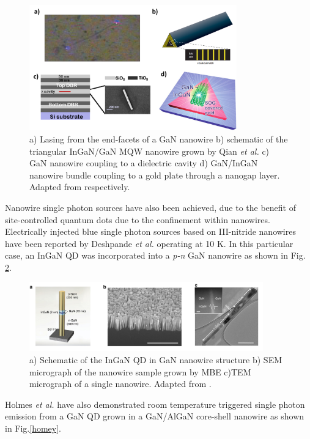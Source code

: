 \begin{figure}[h]
	\centering
	\includegraphics[width=0.8\textwidth]{Figs/Ch1/nw_lasers.png}
	\caption {a) Lasing from the end-facets of a GaN nanowire b) schematic of the triangular InGaN/GaN MQW nanowire grown by Qian {\it et al.} c) GaN nanowire coupling to a dielectric cavity d) GaN/InGaN nanowire bundle coupling to a gold plate through a nanogap layer. Adapted from \cite{Johnson2002,Qian2008,Das2011,Wu2011} respectively.} 
	\label{1.20}
\end{figure}
\FloatBarrier 

Nanowire single photon sources have also been achieved, due to  the benefit of site-controlled quantum dots due to the confinement within nanowires. Electrically injected blue single photon sources based on III-nitride nanowires have been reported by Deshpande {\it et al.} operating at 10 K. In this particular case, an InGaN QD was incorporated into a {\it p-n} GaN nanowire as shown in Fig. \ref{elec}.

\begin{figure}[h]
	\centering
	\includegraphics[width=0.9\textwidth]{Figs/Ch1/elect_SPS.png}
	\caption {a) Schematic of the InGaN QD in GaN nanowire structure b) SEM micrograph of the nanowire sample grown by MBE c)TEM micrograph of a single nanowire. Adapted from \cite{Deshpande2013b}.}
	\label{elec}
\end{figure}
\FloatBarrier 

Holmes \textit{et al.} have also demonstrated room temperature triggered single photon emission from a GaN QD grown in a GaN/AlGaN core-shell nanowire as shown in Fig.\ref{homey}.

